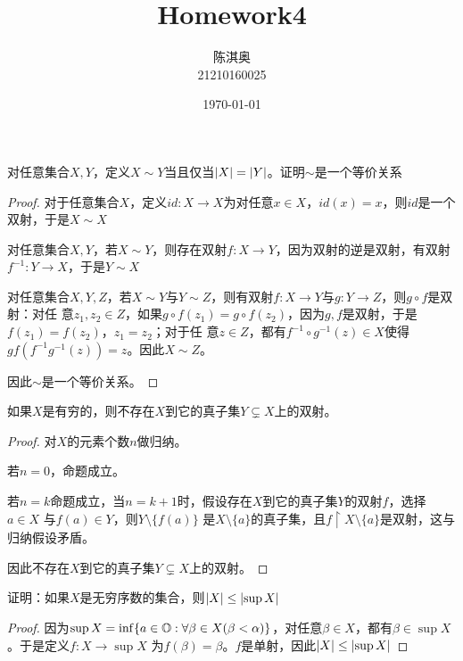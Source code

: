 \documentclass[11pt]{article}
\author{陈淇奥\\21210160025}
\date{\today}
\title{Homework4}
\begin{document}
\maketitle
\begin{exercise}[2.1.3]
对任意集合\(X,Y\)，定义\(X\sim Y\)当且仅当\(\abs{X}=\abs{Y}\)。证明\(\sim\)是一个等价关系
\end{exercise}

\begin{proof}
对于任意集合\(X\)，定义\(id:X\to X\)为对任意\(x\in X\)，\(id(x)=x\)，则\(id\)是一个双射，于是\(X\sim X\)

对任意集合\(X,Y\)，若\(X\sim Y\)，则存在双射\(f:X\to Y\)，因为双射的逆是双射，有双射\(f^{-1}:Y\to X\)，于是\(Y\sim X\)

对任意集合\(X,Y,Z\)，若\(X\sim Y\)与\(Y\sim Z\)，则有双射\(f:X\to Y\)与\(g:Y\to Z\)，则\(g\circ f\)是双射：对任
意\(z_1,z_2\in Z\)，如果\(g\circ f(z_1)=g\circ f(z_2)\)，因为\(g,f\)是双射，于是\(f(z_1)=f(z_2)\)，\(z_1=z_2\)；对于任
意\(z\in Z\)，都有\(f^{-1}\circ g^{-1}(z)\in X\)使得\(gf(f^{-1}g^{-1}(z))=z\)。因此\(X\sim Z\)。

因此\(\sim\)是一个等价关系。
\end{proof}

\begin{exercise}[2.1.8]
如果\(X\)是有穷的，则不存在\(X\)到它的真子集\(Y\subsetneq X\)上的双射。
\end{exercise}

\begin{proof}
对\(X\)的元素个数\(n\)做归纳。

若\(n=0\)，命题成立。

若\(n=k\)命题成立，当\(n=k+1\)时，假设存在\(X\)到它的真子集\(Y\)的双射\(f\)，选择\(a\in X\)
与\(f(a)\in Y\)，则\(Y\setminus\{f(a)\}\)
是\(X\setminus\{a\}\)的真子集，且\(f\upharpoonright X\setminus\{a\}\)是双射，这与归纳假设矛盾。

因此不存在\(X\)到它的真子集\(Y\subsetneq X\)上的双射。
\end{proof}

\begin{exercise}[2.1.16]
证明：如果\(X\)是无穷序数的集合，则\(\abs{X}\le\abs{\sup X}\)
\end{exercise}

\begin{proof}
因为\(\sup X=\inf\{a\in\mathbb{O}:\forall\beta\in X(\beta<\alpha)\}\)，对任意\(\beta\in X\)，都有\(\beta\in\sup X\)。于是定义\(f:X\to\sup X\)
为\(f(\beta)=\beta\)。\(f\)是单射，因此\(\abs{X}\le\abs{\sup X}\)
\end{proof}
\end{document}
